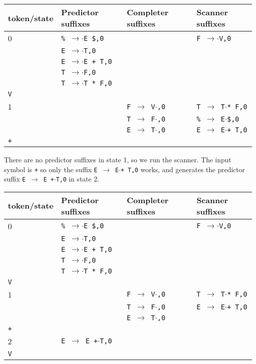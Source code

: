 \documentclass[11pt]{article}
\def\ra{\rightarrow}
\begin{document}
\begin{tabular}{|l|l|l|l|}
\hline
token/state & Predictor suffixes & Completer suffixes & Scanner suffixes\\
\hline
0     & \texttt{\% $\ra$$\cdot$E \$,0} & & \texttt{F $\ra$$\cdot$V,0}\\
      & \texttt{E $\ra$$\cdot$T,0} & & \\
      & \texttt{E $\ra$$\cdot$E + T,0} & & \\
      & \texttt{T $\ra$$\cdot$F,0} & & \\
      & \texttt{T $\ra$$\cdot$T * F,0} & & \\
\hline
\texttt{V} &  & &\\
\hline
1     &  & \texttt{F $\ra$ V$\cdot$,0}& \texttt{T $\ra$ T$\cdot$* F,0}\\
      &  & \texttt{T $\ra$ F$\cdot$,0}& \texttt{\% $\ra$ E$\cdot$\$,0}\\
      &  & \texttt{E $\ra$ T$\cdot$,0}& \texttt{E $\ra$ E$\cdot$+ T,0}\\
\hline
\texttt{+} &  & &\\
\hline
\end{tabular}

There are no predictor suffixes in state 1, so we run the scanner.  The
input symbol is \texttt{+} so only the suffix \texttt{E $\ra$
  E$\cdot$+ T,0} works, and generates the predictor suffix \texttt{E $\ra$ E
  +$\cdot$T,0} in state 2. 

\begin{tabular}{|l|l|l|l|}
\hline
token/state & Predictor suffixes & Completer suffixes & Scanner suffixes\\
\hline
0     & \texttt{\% $\ra$$\cdot$E \$,0} & & \texttt{F $\ra$$\cdot$V,0}\\
      & \texttt{E $\ra$$\cdot$T,0} & & \\
      & \texttt{E $\ra$$\cdot$E + T,0} & & \\
      & \texttt{T $\ra$$\cdot$F,0} & & \\
      & \texttt{T $\ra$$\cdot$T * F,0} & & \\
\hline
\texttt{V} &  & &\\
\hline
1     &  & \texttt{F $\ra$ V$\cdot$,0}& \texttt{T $\ra$ T$\cdot$* F,0} \\
      &  & \texttt{T $\ra$ F$\cdot$,0}& \texttt{E $\ra$ E$\cdot$+ T,0} \\
      &  & \texttt{E $\ra$ T$\cdot$,0}& \\
\hline
\texttt{+} &  & &\\
\hline
 2    & \texttt{E $\ra$ E +$\cdot$T,0} & & \\
\hline 
\texttt{V} &  & &\\
\hline
\end{tabular}
\end{document}

